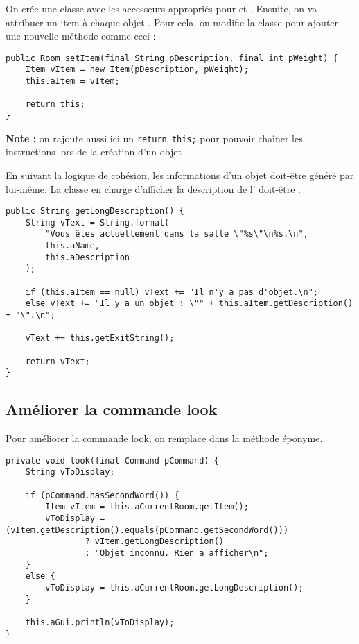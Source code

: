 \begin{exercise}[subtitle=Item]

On crée une classe  avec les accesseurs appropriés pour  et . Ensuite, on va attribuer un item à chaque objet . Pour cela, on modifie la classe pour ajouter une nouvelle méthode comme ceci :

\begin{verbatim}
public Room setItem(final String pDescription, final int pWeight) {
    Item vItem = new Item(pDescription, pWeight);
    this.aItem = vItem;
    
    return this;
}
\end{verbatim}

\textbf{Note :} on rajoute aussi ici un \texttt{return this;} pour pouvoir chaîner les instructions lors de la création d'un objet .
\end{exercise}

\begin{exercise}[subtitle=Item description]

En suivant la logique de cohésion, les informations d'un objet  doit-être généré par  lui-même. La classe en charge d'afficher la description de l' doit-être .

\begin{verbatim}
public String getLongDescription() {
    String vText = String.format(
        "Vous êtes actuellement dans la salle \"%s\"\n%s.\n",
        this.aName,
        this.aDescription
    );

    if (this.aItem == null) vText += "Il n'y a pas d'objet.\n";
    else vText += "Il y a un objet : \"" + this.aItem.getDescription() + "\".\n";

    vText += this.getExitString();

    return vText;
}
\end{verbatim}

\subsection*{Améliorer la commande look}

Pour améliorer la commande look, on remplace dans  la méthode éponyme.

\begin{verbatim}
private void look(final Command pCommand) {
    String vToDisplay;

    if (pCommand.hasSecondWord()) {
        Item vItem = this.aCurrentRoom.getItem();
        vToDisplay = (vItem.getDescription().equals(pCommand.getSecondWord()))
                ? vItem.getLongDescription()
                : "Objet inconnu. Rien a afficher\n";
    }
    else {
        vToDisplay = this.aCurrentRoom.getLongDescription();
    }

    this.aGui.println(vToDisplay);
}
\end{verbatim}
\end{exercise}

